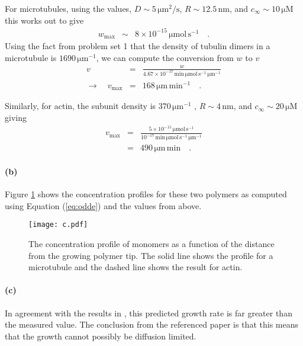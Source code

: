 \documentclass[12pt]{article}
\newcommand{\eq}[1]{Equation (\ref{eq:#1})}
\newcommand{\Fig}[1]{Figure \ref{fig:#1}}
\newcommand{\figlabel}[1]{\label{fig:#1}}
\begin{document}
For microtubules, using the values, $D \sim 5\,\mathrm{\mu m^2/s}$,
$R \sim 12.5\,\mathrm{nm}$, and $c_\infty \sim 10\,\mathrm{\mu M}$ this works
out to give
\begin{eqnarray}
w_\mathrm{max} &\sim& 8 \times 10^{-15} \, \mathrm{\mu mol\,s^{-1}} \quad.
\end{eqnarray}
Using the fact from problem set 1 that the density of tubulin dimers in a
microtubule is $1690\,\mathrm{\mu m^{-1}}$, we can compute the conversion from
$w$ to $v$
\begin{eqnarray}
v &=& \frac{w}{4.67\times10^{-17} \, \mathrm{min\,\mu mol\,s^{-1}\,\mu
        m^{-1}}} \\
\to \quad v_\mathrm{max} &=& 168 \, \mathrm{\mu m \, min^{-1}} \quad.
\end{eqnarray}

Similarly, for actin, the subunit density is $370\,\mathrm{\mu m^{-1}}$
\cite{pollard}, $R\sim 4\,\mathrm{nm}$, and $c_\infty \sim 20\,\mathrm{\mu
M}$ giving
\begin{eqnarray}
v_\mathrm{max} &=& \frac{5\times10^{-15} \, \mathrm{\mu mol\, s^{-1}}}
            {10^{-17} \, \mathrm{min\,\mu mol\,s^{-1}\,\mu m^{-1}}} \\
&=& 490 \, \mathrm{\mu m \, min} \quad.
\end{eqnarray}

\paragraph{(b)}

\Fig{concent} shows the concentration profiles for these two polymers as
computed using \eq{odde} and the values from above.

\begin{figure}[htbp]
\begin{center}
\texttt{[image: c.pdf]}
\end{center}
\caption{%
The concentration profile of monomers as a function of the distance from the
growing polymer tip. The solid line shows the profile for a microtubule and
the dashed line shows the result for actin.
\figlabel{concent}}
\end{figure}

\paragraph{(c)}

In agreement with the results in \cite{odde}, this predicted growth rate is
far greater than the measured value.
The conclusion from the referenced paper is that this means that the growth
cannot possibly be diffusion limited.


{}

\end{document}

